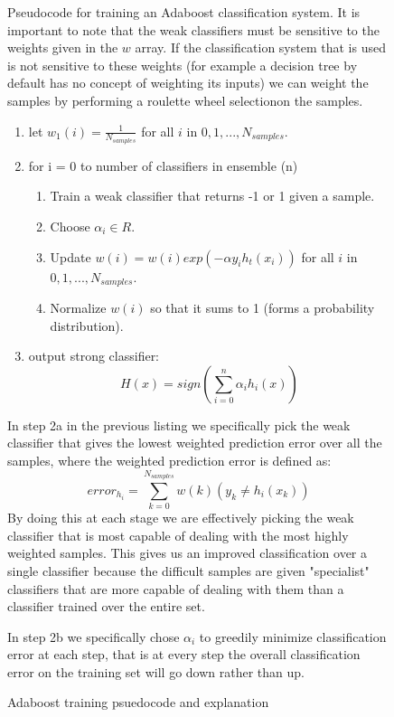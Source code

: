 \documentclass[ %
                    author={Sam Phippen},
                supervisor={Dr. Rafal Bogacz},
                     title={Real time voice activity detectors in noisy personal computing environments},
                  subtitle={},
                    degree={MEng},
                      year={2012} ]{thesis}
\begin{document}
\begin{figure}
    Pseudocode for training an Adaboost classification system. It is important
    to note that the weak classifiers must be sensitive to the weights given in
    the $w$ array. If the classification system that is used is not sensitive
    to these weights (for example a decision tree by default has no concept of
    weighting its inputs) we can weight the samples by performing a roulette
    wheel selection\footnotemark on the samples.

    \vspace{3em}

    \begin{enumerate}

        \item let $w_1(i)=\frac{1}{N_{samples}}$ for all $i$ in
            $0,1,...,N_{samples}$.

        \item for i = 0 to number of classifiers in ensemble (n)
            \begin{enumerate}

                \item Train a weak classifier that returns -1 or 1 given a
                    sample.
                \item Choose $\alpha_i \in R$.
                \item Update $w(i) = w(i)exp(-\alpha y_i h_t(x_i))$ for all $i$ in
            $0,1,...,N_{samples}$.
            \item Normalize $w(i)$ so that it sums to 1 (forms a probability distribution).

            \end{enumerate}
        \item output strong classifier: $$H(x) = sign\left(\sum_{i=0}^{n}\alpha_i h_i(x)\right)$$
    \end{enumerate}

    \vspace{3em}

    In step 2a in the previous listing we specifically pick the weak classifier
    that gives the lowest weighted prediction error over all the samples, where
    the weighted prediction error is defined as: $$error_{h_i} =
    \sum_{k=0}^{N_{samples}} w(k)(y_k\neq h_i(x_k))$$By doing this at each
    stage we are effectively picking the weak classifier that is most capable
    of dealing with the most highly weighted samples. This gives us an improved
    classification over a single classifier because the difficult samples are
    given "specialist" classifiers that are more capable of dealing with them
    than a classifier trained over the entire set.

    In step 2b we specifically chose $\alpha_i$ to greedily minimize
    classification error at each step, that is at every step the overall
    classification error on the training set will go down rather than up.

    \label{pseudo:adaboost}
    \caption{Adaboost training psuedocode and explanation}

\end{figure}
\end{document}
